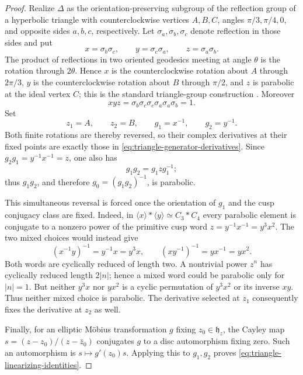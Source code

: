 \begin{proof}
Realize \(\Delta\) as the orientation-preserving subgroup of the reflection
group of a hyperbolic triangle with counterclockwise vertices \(A,B,C\),
angles \(\pi/3,\pi/4,0\), and opposite sides \(a,b,c\), respectively.  Let
\(\sigma_a,\sigma_b,\sigma_c\) denote reflection in those sides and put
\[
 x=\sigma_b\sigma_c,\qquad
 y=\sigma_c\sigma_a,\qquad
 z=\sigma_a\sigma_b.
\]
The product of reflections in two oriented geodesics meeting at angle
\(\theta\) is the rotation through \(2\theta\).  Hence \(x\) is the
counterclockwise rotation about \(A\) through \(2\pi/3\), \(y\) is the
counterclockwise rotation about \(B\) through \(\pi/2\), and \(z\) is
parabolic at the ideal vertex \(C\); this is the standard triangle-group
construction \cite[Chapters~7 and~10]{Beardon1983}.  Moreover
\[
 xyz=\sigma_b\sigma_c\sigma_c\sigma_a\sigma_a\sigma_b=1.
\]
Set
\[
 z_1=A,\qquad z_2=B,\qquad g_1=x^{-1},\qquad g_2=y^{-1}.
\]
Both finite rotations are thereby reversed, so their complex derivatives at
their fixed points are exactly those in
\cref{eq:triangle-generator-derivatives}.  Since
\(g_2g_1=y^{-1}x^{-1}=z\), one also has
\[
 g_1g_2=g_1zg_1^{-1};
\]
thus \(g_1g_2\), and therefore \(g_0=(g_1g_2)^{-1}\), is parabolic.

This simultaneous reversal is forced once the orientation of \(g_1\) and
the cusp conjugacy class are fixed.  Indeed, in
\(\langle x\rangle*\langle y\rangle\simeq C_3*C_4\) every parabolic element
is conjugate to a nonzero power of the primitive cusp word
\(z=y^{-1}x^{-1}=y^3x^2\).  The two mixed choices would instead give
\[
 (x^{-1}y)^{-1}=y^{-1}x=y^3x,
 \qquad
 (xy^{-1})^{-1}=yx^{-1}=yx^2.
\]
Both words are cyclically reduced of length two.  A nontrivial power
\(z^n\) has cyclically reduced length \(2|n|\); hence a mixed word could be
parabolic only for \(|n|=1\).  But neither \(y^3x\) nor \(yx^2\) is a cyclic
permutation of \(y^3x^2\) or its inverse \(xy\).  Thus neither mixed choice
is parabolic.  The derivative selected at \(z_1\) consequently fixes the
derivative at \(z_2\) as well.

Finally, for an elliptic M\"obius transformation \(g\) fixing
\(z_0\in\mathfrak h_z\), the Cayley map
\(s=(z-z_0)/(z-\bar z_0)\) conjugates \(g\) to a disc automorphism fixing
zero.  Such an automorphism is \(s\mapsto g'(z_0)s\).  Applying this to
\(g_1,g_2\) proves \cref{eq:triangle-linearizing-identities}.
\end{proof}

